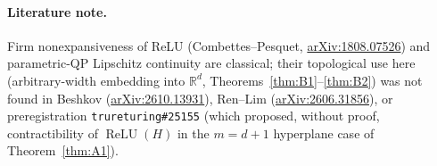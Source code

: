 \documentclass[11pt]{article}
\theoremstyle{plain}
\theoremstyle{definition}
\theoremstyle{remark}
\begin{document}
\paragraph{Literature note.}
Firm nonexpansiveness of ReLU (Combettes--Pesquet, \href{https://arxiv.org/abs/1808.07526}{arXiv:1808.07526}) and parametric-QP Lipschitz continuity are classical; their topological use here (arbitrary-width embedding into $\mathbb{R}^d$, Theorems~\ref{thm:B1}--\ref{thm:B2}) was not found in Beshkov (\href{https://arxiv.org/abs/2610.13931}{arXiv:2610.13931}), Ren--Lim (\href{https://arxiv.org/abs/2606.31856}{arXiv:2606.31856}), or preregistration \texttt{trureturing\#25155} (which proposed, without proof, contractibility of $\operatorname{ReLU}(H)$ in the $m = d+1$ hyperplane case of Theorem~\ref{thm:A1}).
\end{document}
